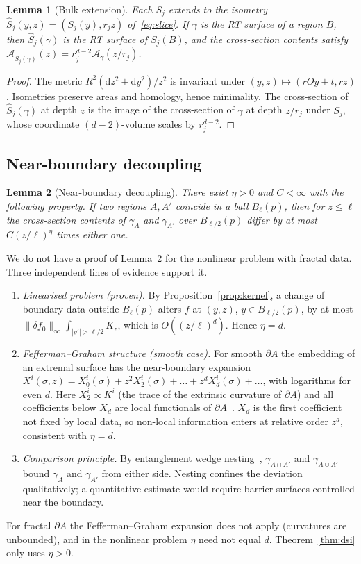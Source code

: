 \documentclass[11pt]{article}
\newtheorem{lemma}{Lemma}
\theoremstyle{definition}\newtheorem{definition}{Definition}[section]
\theoremstyle{remark}\newtheorem*{remark}{Remark}
\newcommand{\cA}{\mathcal{A}}
\newcommand{\dd}{\mathrm{d}}
\begin{document}
\begin{lemma}[Bulk extension]
\label{lem:extension}
Each $S_j$ extends to the isometry $\hat S_j(y,z)=(S_j(y),r_jz)$ of~\eqref{eq:slice}. If $\gamma$ is the RT
surface of a region $B$, then $\hat S_j(\gamma)$ is the RT surface of $S_j(B)$, and the cross-section
contents satisfy $\cA_{\hat S_j(\gamma)}(z)=r_j^{d-2}\cA_\gamma(z/r_j)$.
\end{lemma}
\begin{proof}
The metric $R^2(\dd z^2+\dd y^2)/z^2$ is invariant under $(y,z)\mapsto(rOy+t,rz)$. Isometries preserve areas and
homology, hence minimality. The cross-section of $\hat S_j(\gamma)$ at depth $z$ is the image of the
cross-section of $\gamma$ at depth $z/r_j$ under $S_j$, whose coordinate $(d-2)$-volume scales by
$r_j^{d-2}$.
\end{proof}

\subsection{Near-boundary decoupling}
\begin{lemma}[Near-boundary decoupling]
\label{lem:decoupling}
There exist $\eta>0$ and $C<\infty$ with the following property. If two regions $A,A'$ coincide in a ball
$B_\ell(p)$, then for $z\le\ell$ the cross-section contents of $\gamma_A$ and $\gamma_{A'}$ over $B_{\ell/2}(p)$
differ by at most $C(z/\ell)^{\eta}$ times either one.
\end{lemma}
We do not have a proof of Lemma~\ref{lem:decoupling} for the nonlinear problem with fractal data. Three
independent lines of evidence support it.
\begin{enumerate}
\item \emph{Linearised problem (proven).} By Proposition~\ref{prop:kernel}, a change of boundary data outside
$B_\ell(p)$ alters $f$ at $(y,z)$, $y\in B_{\ell/2}(p)$, by at most $\|\delta f_0\|_\infty\int_{|y'|>\ell/2}K_z$,
which is $O((z/\ell)^d)$. Hence $\eta=d$.
\item \emph{Fefferman--Graham structure (smooth case).} For smooth $\partial A$ the embedding of an extremal
surface has the near-boundary expansion
$X^i(\sigma,z)=X^i_0(\sigma)+z^2X^i_2(\sigma)+\dots+z^dX^i_d(\sigma)+\dots$, with logarithms for even $d$. Here
$X_2^i\propto K^i$ (the trace of the extrinsic curvature of $\partial A$) and all coefficients below
$X_d$ are local functionals of $\partial A$~\cite{GW}. $X_d$ is the first coefficient not fixed by local
data, so non-local information enters at relative order $z^d$, consistent with $\eta=d$.
\item \emph{Comparison principle.} By entanglement wedge nesting~\cite{Wall}, $\gamma_{A\cap A'}$ and
$\gamma_{A\cup A'}$ bound $\gamma_A$ and $\gamma_{A'}$ from either side. Nesting confines the deviation
qualitatively; a quantitative estimate would require barrier surfaces controlled near the boundary.
\end{enumerate}
For fractal $\partial A$ the Fefferman--Graham expansion does not apply (curvatures are unbounded), and in
the nonlinear problem $\eta$ need not equal $d$. Theorem~\ref{thm:dsi} only uses $\eta>0$.
\end{document}
